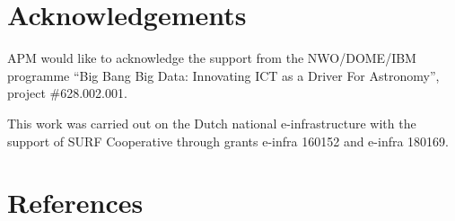 \documentclass[preprint,5p]{elsarticle}
\begin{document}


\section*{Acknowledgements}
APM would like to acknowledge the support from the NWO/DOME/IBM programme ``Big Bang Big Data: Innovating ICT as a Driver For Astronomy'', project \#628.002.001.

This work was carried out on the Dutch national e-infrastructure with the support of SURF
Cooperative through grants e-infra 160152 and e-infra 180169.

\section*{References}

\end{document}
